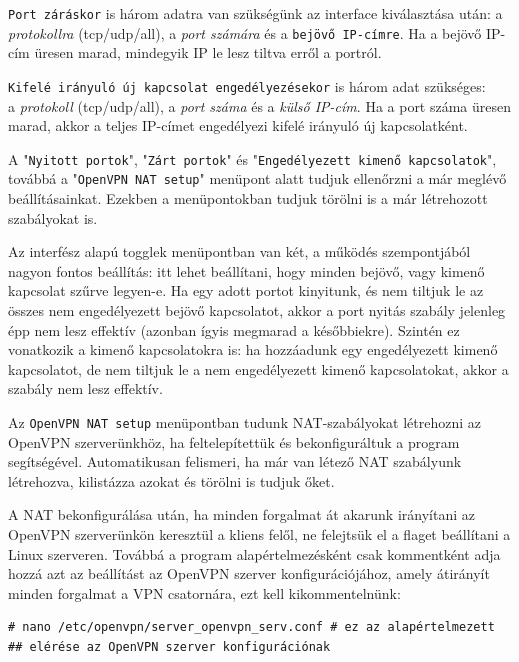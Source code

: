 \texttt{Port záráskor} is három adatra van szükségünk az interface kiválasztása után: a \textit{protokollra} (tcp/udp/all), a \textit{port számára} és a \texttt{bejövő IP-címre}. Ha a bejövő IP-cím üresen marad, mindegyik IP le lesz tiltva erről a portról.

\texttt{Kifelé irányuló új kapcsolat engedélyezésekor} is három adat szükséges: \\a \textit{protokoll} (tcp/udp/all), a \textit{port száma} és a \textit{külső IP-cím}. Ha a port száma üresen marad, akkor a teljes IP-címet engedélyezi kifelé irányuló új kapcsolatként.

A "\texttt{Nyitott portok}", "\texttt{Zárt portok}" és "\texttt{Engedélyezett kimenő kapcsolatok}", továbbá a "\texttt{OpenVPN NAT setup}" menüpont alatt tudjuk ellenőrzni a már meglévő beállításainkat. Ezekben a menüpontokban tudjuk törölni is a már létrehozott szabályokat is.

Az interfész alapú togglek menüpontban van két, a működés szempontjából nagyon fontos beállítás: itt lehet beállítani, hogy minden bejövő, vagy kimenő kapcsolat szűrve legyen-e. Ha egy adott portot kinyitunk, és nem tiltjuk le az összes nem engedélyezett bejövő kapcsolatot, akkor a port nyitás szabály jelenleg épp nem lesz effektív (azonban ígyis megmarad a későbbiekre). Szintén ez vonatkozik a kimenő kapcsolatokra is: ha hozzáadunk egy engedélyezett kimenő kapcsolatot, de nem tiltjuk le a nem engedélyezett kimenő kapcsolatokat, akkor a szabály nem lesz effektív.

Az \texttt{OpenVPN NAT setup} menüpontban tudunk NAT-szabályokat létrehozni az\\ OpenVPN szerverünkhöz, ha feltelepítettük és bekonfiguráltuk a program segítségével. Automatikusan felismeri, ha már van létező NAT szabályunk létrehozva, kilistázza azokat és törölni is tudjuk őket. 


A NAT bekonfigurálása után, ha minden forgalmat át akarunk irányítani az\\ OpenVPN szerverünkön keresztül a kliens felől, ne felejtsük el a \textit{} flaget beállítani a Linux szerveren. Továbbá a program alapértelmezésként csak kommentként adja hozzá azt az beállítást az OpenVPN szerver konfigurációjához, amely átirányít minden forgalmat a VPN csatornára, ezt kell kikommentelnünk:

\begin{verbatim}
# nano /etc/openvpn/server_openvpn_serv.conf # ez az alapértelmezett
## elérése az OpenVPN szerver konfigurációnak
\end{verbatim}

